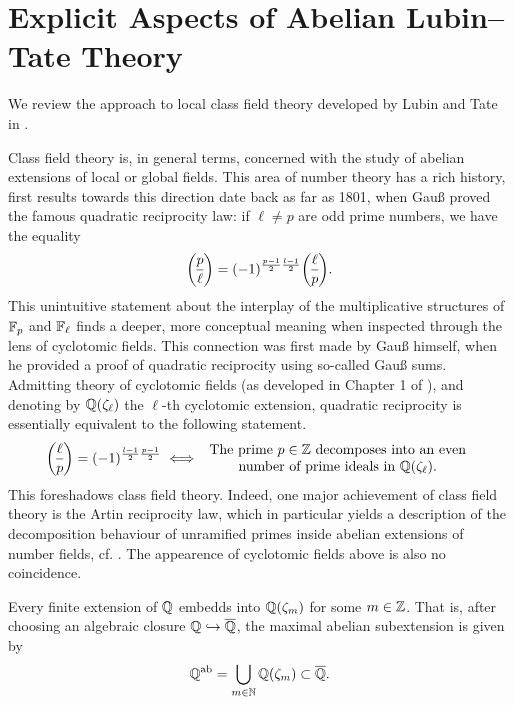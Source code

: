 \documentclass[../main.tex]{subfiles}
\begin{document}
\section{Explicit Aspects of Abelian Lubin--Tate Theory} %
\label{sec:Local Class Field Theory}
We review the approach to local class field theory developed by Lubin and Tate in
\cite{LubinTateFormalMult}. 

Class field theory is, in general terms, concerned with the study of 
abelian extensions of local or global fields. This area of number theory 
has a rich history, first results towards this direction date back as far as
1801, when Gauß proved the famous quadratic reciprocity law: if $\ell \neq p$
are odd prime numbers, we have the equality
\begin{equation*}
  \legendre p \ell = (-1)^{\frac{p-1}2 \frac{l-1}2} \legendre \ell p.
\end{equation*}
This unintuitive statement about the interplay of the multiplicative structures of
$\mathbb{F}_p$ and $\mathbb{F}_\ell$ finds a deeper, more conceptual meaning when inspected through
the lens of cyclotomic fields. This connection
was first made by Gauß himself, when he provided a proof of quadratic
reciprocity using so-called Gauß sums. Admitting theory of cyclotomic fields 
(as developed in Chapter 1 of \cite{neukirch2006algebraische}), and denoting by
$\mathbb{Q}(\zeta_\ell)$ the $\ell$-th cyclotomic extension,
quadratic reciprocity is essentially equivalent to the following statement.
\begin{equation*}
  \legendre \ell p = (-1)^{\frac{l-1}2 \frac{p-1}2} \iff \begin{array}c
    \text{The prime $p \in \Z$
    decomposes into an even} \\ \text{number of prime ideals in
  $\Q(\zeta_\ell)$.} \end{array}
\end{equation*}
This foreshadows class field theory. Indeed, one major achievement
of class field theory is the Artin reciprocity law, which in particular yields a 
description of the decomposition behaviour of unramified primes inside abelian extensions
of number fields, cf. \cite[Theorem 7.3]{neukirch2006algebraische}. 
The appearence of cyclotomic fields above is also no coincidence.

\begin{thm} \label{thm:KroneckerWeber}
  Every finite extension of $\mathbb{Q}$ embedds into $\mathbb{Q}(\zeta_m)$ for some $m \in \mathbb{Z}$.
  That is, after choosing an algebraic closure $\mathbb{Q} \hookrightarrow \overline {\mathbb{Q}}$, the maximal abelian
  subextension is given by 
  \begin{equation*}
    \mathbb{Q}^{\mathrm{ab}} = \bigcup_{m \in \mathbb{N}} \mathbb{Q}(\zeta_m) \subset \overline {\mathbb{Q}}.
  \end{equation*}
\end{thm}
\end{document}
